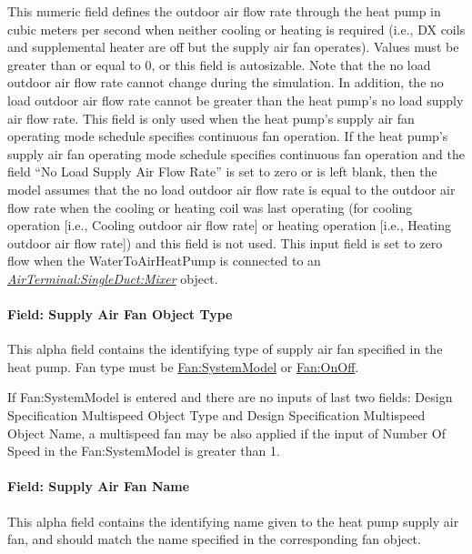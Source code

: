 This numeric field defines the outdoor air flow rate through the heat pump in cubic meters per second when neither cooling or heating is required (i.e., DX coils and supplemental heater are off but the supply air fan operates). Values must be greater than or equal to 0, or this field is autosizable. Note that the no load outdoor air flow rate cannot change during the simulation. In addition, the no load outdoor air flow rate cannot be greater than the heat pump's no load supply air flow rate. This field is only used when the heat pump's supply air fan operating mode schedule specifies continuous fan operation. If the heat pump's supply air fan operating mode schedule specifies continuous fan operation and the field ``No Load Supply Air Flow Rate'' is set to zero or is left blank, then the model assumes that the no load outdoor air flow rate is equal to the outdoor air flow rate when the cooling or heating coil was last operating (for cooling operation {[}i.e., Cooling outdoor air flow rate{]} or heating operation {[}i.e., Heating outdoor air flow rate{]}) and this field is not used. This input field is set to zero flow when the WaterToAirHeatPump is connected to an \textit{\hyperref[airterminalsingleductmixer]{AirTerminal:SingleDuct:Mixer}} object.

\paragraph{Field: Supply Air Fan Object Type}\label{field-supply-air-fan-object-type-7}

This alpha field contains the identifying type of supply air fan specified in the heat pump. Fan type must be \hyperref[fansystemmodel]{Fan:SystemModel} or \hyperref[fanonoff]{Fan:OnOff}.

If Fan:SystemModel is entered and there are no inputs of last two fields: Design Specification Multispeed Object Type and Design Specification Multispeed Object Name, a multispeed fan may be also applied if the input of Number Of Speed in the Fan:SystemModel is greater than 1.

\paragraph{Field: Supply Air Fan Name}\label{field-supply-air-fan-name-6}

This alpha field contains the identifying name given to the heat pump supply air fan, and should match the name specified in the corresponding fan object.

